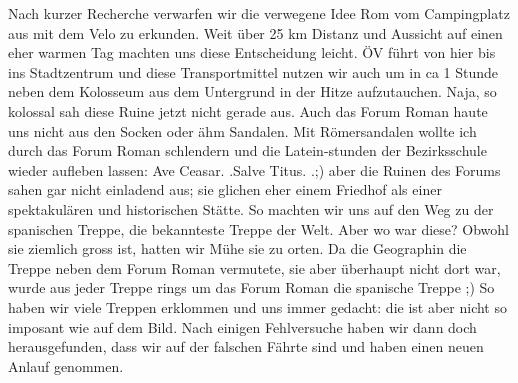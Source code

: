 Nach kurzer Recherche verwarfen wir die verwegene Idee Rom vom Campingplatz aus mit dem Velo zu erkunden.
Weit über 25 km Distanz und Aussicht auf einen eher warmen Tag machten uns diese Entscheidung leicht.
ÖV führt von hier bis ins Stadtzentrum und diese Transportmittel nutzen wir auch um in ca 1 Stunde neben dem Kolosseum aus dem Untergrund in der Hitze aufzutauchen.
Naja, so kolossal sah diese Ruine jetzt nicht gerade aus.
Auch das Forum Roman haute uns nicht aus den Socken oder ähm Sandalen.
Mit Römersandalen wollte ich durch das Forum Roman schlendern und die Latein-stunden der Bezirksschule wieder aufleben lassen: Ave Ceasar.
.Salve Titus.
.;) aber die Ruinen des Forums sahen gar nicht einladend aus; sie glichen eher einem Friedhof als einer spektakulären und historischen Stätte.
So machten wir uns auf den Weg zu der spanischen Treppe, die bekannteste Treppe der Welt.
Aber wo war diese? Obwohl sie ziemlich gross ist, hatten wir Mühe sie zu orten.
Da die Geographin die Treppe neben dem Forum Roman vermutete, sie aber überhaupt nicht dort war, wurde aus jeder Treppe rings um das Forum Roman die spanische Treppe ;) So haben wir viele Treppen erklommen und uns immer gedacht: die ist aber nicht so imposant wie auf dem Bild.
Nach einigen Fehlversuche haben wir dann doch herausgefunden, dass wir auf der falschen Fährte sind und haben einen neuen Anlauf genommen.

